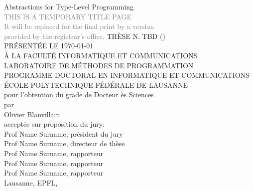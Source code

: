 \begin{titlepage}
\begin{otherlanguage}{french}
\begin{center}
\sffamily
\null\vspace{2cm}
\huge Abstractions for Type-Level Programming\\[24pt]
\textcolor{gray}{\small THIS IS A TEMPORARY TITLE PAGE\\
It will be replaced for the final print by a version\\[-14pt]
provided by the registrar's office.}
\vfill
\normalsize THÈSE N. TBD (\the\year)\\[10pt]
PRÉSENTÉE LE {\MakeUppercase\today}\\
À LA FACULTÉ INFORMATIQUE ET COMMUNICATIONS\\
LABORATOIRE DE MÉTHODES DE PROGRAMMATION\\
PROGRAMME DOCTORAL EN INFORMATIQUE ET COMMUNICATIONS\\[10pt]
ÉCOLE POLYTECHNIQUE FÉDÉRALE DE LAUSANNE\\
pour l'obtention du grade de Docteur ès Sciences\\
par\\[20pt]
\Large Olivier Blanvillain\\[20pt]
\small acceptée sur proposition du jury:\\[4pt]
Prof Name Surname, président du jury\\
Prof Name Surname, directeur de thèse\\
Prof Name Surname, rapporteur\\
Prof Name Surname, rapporteur\\
Prof Name Surname, rapporteur\\[12pt]
Lausanne, EPFL, \the\year
\end{center}
\vspace{2cm}
\end{otherlanguage}
\end{titlepage}

